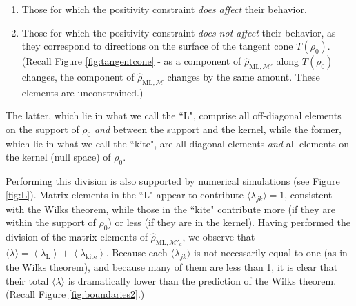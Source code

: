 \documentclass[aps,pra, twocolumn]{revtex4-1}
\newcommand{\M}{\mathcal{M}}
\newcommand{\expect}[1]{\ensuremath{\left\langle#1\right\rangle}}
\newcommand{\rhohat}{\hat{\rho}}
\newcommand{\rhoML}[1]{\rhohat_{\scriptscriptstyle{\mathrm{ML},#1}}}
\begin{document}
\begin{enumerate}[noitemsep]
\item Those for which the positivity constraint \emph{does affect} their behavior.
\item Those for which the positivity constraint \emph{does not affect} their behavior, as they correspond to directions on the surface of the tangent cone $T(\rho_{0})$. (Recall Figure \ref{fig:tangentcone} - as a component of $\rhoML{\M'}$ along $T(\rho_{0})$ changes, the component of $\rhoML{\M}$ changes by the same amount. These elements are unconstrained.)
\end{enumerate}
The latter, which lie in what we call the ``L", comprise all off-diagonal elements on the support of $\rho_0$ \emph{and} between the support and the kernel, while the former, which lie in what we call the ``kite", are all diagonal elements \emph{and} all elements on the kernel (null space) of $\rho_0$.

Performing this division is also supported by numerical simulations (see Figure \ref{fig:L}). Matrix elements in the ``L" appear to contribute $\langle \lambda_{jk}\rangle = 1$, consistent with the Wilks theorem, while those in the ``kite" contribute more (if they are within the support of $\rho_{0}$) or less (if they are in the kernel).  Having performed the division of the matrix elements of $\rhoML{\M'_{d}}$, we observe that $\langle\lambda\rangle = \expect{\lambda_{\mathrm{L}}} + \expect{\lambda_{\mathrm{kite}}}$. Because each $\langle \lambda_{jk}\rangle$ is not necessarily equal to one (as in the Wilks theorem), and because many of them are less than 1, it is clear that their total $\langle \lambda \rangle$ is dramatically lower than the prediction of the Wilks theorem. (Recall Figure \ref{fig:boundaries2}.)
\end{document}

